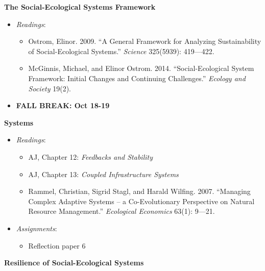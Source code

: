 \week \textbf{The Social-Ecological Systems Framework}

\begin{itemize}

\item
  \emph{Readings}:

  \begin{itemize}
  
  \item
    Ostrom, Elinor. 2009. ``A General Framework for Analyzing
    Sustainability of Social-Ecological Systems.'' \emph{Science}
    325(5939): 419---422.
  \item
    McGinnis, Michael, and Elinor Ostrom. 2014. ``Social-Ecological
    System Framework: Initial Changes and Continuing Challenges.''
    \emph{Ecology and Society} 19(2).
  \end{itemize}
\item
  \textbf{FALL BREAK: Oct 18-19}
\end{itemize}

\week \textbf{Systems}

\begin{itemize}

\item
  \emph{Readings}:

  \begin{itemize}
  
  \item
    AJ, Chapter 12: \emph{Feedbacks and Stability}
  \item
    AJ, Chapter 13: \emph{Coupled Infrastructure Systems}
  \item
    Rammel, Christian, Sigrid Stagl, and Harald Wilfing. 2007.
    ``Managing Complex Adaptive Systems -- a Co-Evolutionary Perspective
    on Natural Resource Management.'' \emph{Ecological Economics} 63(1):
    9---21.
  \end{itemize}
\item
  \emph{Assignments}:

  \begin{itemize}
  
  \item
    Reflection paper 6
  \end{itemize}
\end{itemize}

\week \textbf{Resilience of Social-Ecological Systems}


